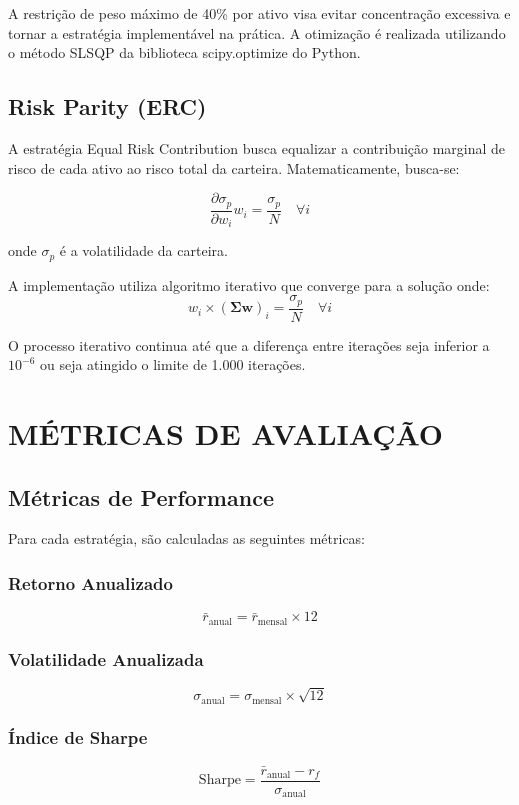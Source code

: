A restrição de peso máximo de 40\% por ativo visa evitar concentração excessiva e tornar a estratégia implementável na prática. A otimização é realizada utilizando o método SLSQP da biblioteca scipy.optimize do Python.

\subsection{Risk Parity (ERC)}

A estratégia Equal Risk Contribution busca equalizar a contribuição marginal de risco de cada ativo ao risco total da carteira. Matematicamente, busca-se:

$$\frac{\partial \sigma_p}{\partial w_i} w_i = \frac{\sigma_p}{N} \quad \forall i$$

onde $\sigma_p$ é a volatilidade da carteira.

A implementação utiliza algoritmo iterativo que converge para a solução onde:
$$w_i \times (\boldsymbol{\Sigma} \boldsymbol{w})_i = \frac{\sigma_p}{N} \quad \forall i$$

O processo iterativo continua até que a diferença entre iterações seja inferior a $10^{-6}$ ou seja atingido o limite de 1.000 iterações.

\section{MÉTRICAS DE AVALIAÇÃO}

\subsection{Métricas de Performance}

Para cada estratégia, são calculadas as seguintes métricas:

\subsubsection{Retorno Anualizado}
$$\bar{r}_{\text{anual}} = \bar{r}_{\text{mensal}} \times 12$$

\subsubsection{Volatilidade Anualizada}
$$\sigma_{\text{anual}} = \sigma_{\text{mensal}} \times \sqrt{12}$$

\subsubsection{Índice de Sharpe}
$$\text{Sharpe} = \frac{\bar{r}_{\text{anual}} - r_f}{\sigma_{\text{anual}}}$$

